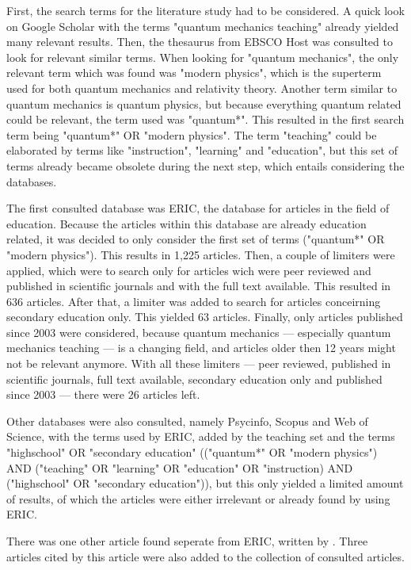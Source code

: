 \documentclass[11pt,twoside]{report} %
\begin{document}
First, the search terms for the  literature study had to be considered. A quick look on Google Scholar with the terms "quantum mechanics teaching" already yielded many relevant results. Then, the thesaurus from EBSCO Host was consulted to look for relevant similar terms. When looking for "quantum mechanics", the only relevant term which was found was "modern physics", which is the superterm used for both quantum mechanics and relativity theory. Another term similar to quantum mechanics is quantum physics, but because everything quantum related could be relevant, the term used was "quantum*". This resulted in the first search term being "quantum*" OR "modern physics". The term "teaching" could be elaborated by terms like "instruction", "learning" and "education", but this set of terms already became obsolete during the next step, which entails considering the databases.

The first consulted database was ERIC, the database for articles in the field of education. Because the articles within this database are already education related, it was decided to only consider the first set of terms ("quantum*" OR "modern physics"). This results in 1,225 articles. Then, a couple of limiters were applied, which were to search only for articles wich were peer reviewed and published in scientific journals and with the full text available. This resulted in 636 articles. After that, a limiter was added to search for articles conceirning secondary education only. This yielded 63 articles. Finally, only articles published since 2003 were considered, because quantum mechanics --- especially quantum mechanics teaching --- is a changing field, and articles older then 12 years might not be relevant anymore. With all these limiters --- peer reviewed, published in scientific journals, full text available, secondary education only and published since 2003 --- there were 26 articles left.

Other databases were also consulted, namely Psycinfo, Scopus and Web of Science, with the terms used by ERIC, added by the teaching set and the terms "highschool" OR "secondary education" (("quantum*" OR "modern physics") AND ("teaching" OR "learning" OR "education" OR "instruction) AND ("highschool" OR "secondary education")), but this only yielded a limited amount of results, of which the articles were either irrelevant or already found by using ERIC.

There was one other article found seperate from ERIC, written by . Three articles cited by this article were also added to the collection of consulted articles.
\end{document}
